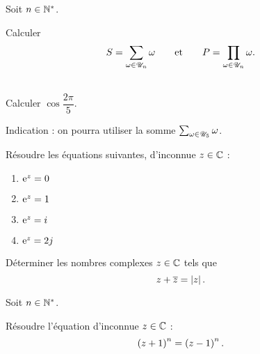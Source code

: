 \begin{corr}
\end{corr}

\begin{exo}[Exercice 13]
Soit \(n\in\mathbb{N}^*\).

Calculer \[S=\sum_{\omega\in\mathscr{U}_n}\omega\qquad\text{et}\qquad P=\prod_{\omega\in\mathscr{U}_n}\omega.\]
\end{exo}

\begin{corr}
\end{corr}

\begin{exo}[Exercice 14]~\\
Calculer \(\cos\dfrac{2\pi}{5}\).

Indication : on pourra utiliser la somme \(\sum_{\omega\in\mathscr{U}_5}\omega\).
\end{exo}

\begin{corr}
\end{corr}

\begin{exo}[Exercice 15]
Résoudre les équations suivantes, d'inconnue \(z\in\mathbb{C}\) :

\begin{enumerate}
\item \(\mathrm{e}^{z}=0\) \\

\item \(\mathrm{e}^{z}=1\) \\

\item \(\mathrm{e}^{z}=i\mkern1mu\) \\

\item \(\mathrm{e}^{z}=2j\)
\end{enumerate}
\end{exo}

\begin{corr}
\end{corr}

\begin{exo}[Exercice 16]
Déterminer les nombres complexes \(z\in\mathbb{C}\) tels que \[z+\overline{z}=\left\lvert z\right\rvert.\]
\end{exo}

\begin{corr}
\end{corr}

\begin{exo}[Exercice 17]
Soit \(n\in\mathbb{N}^*\).

Résoudre l'équation d'inconnue \(z\in\mathbb{C}\) : \[\left(z+1\right)^n=\left(z-1\right)^n.\]
\end{exo}

